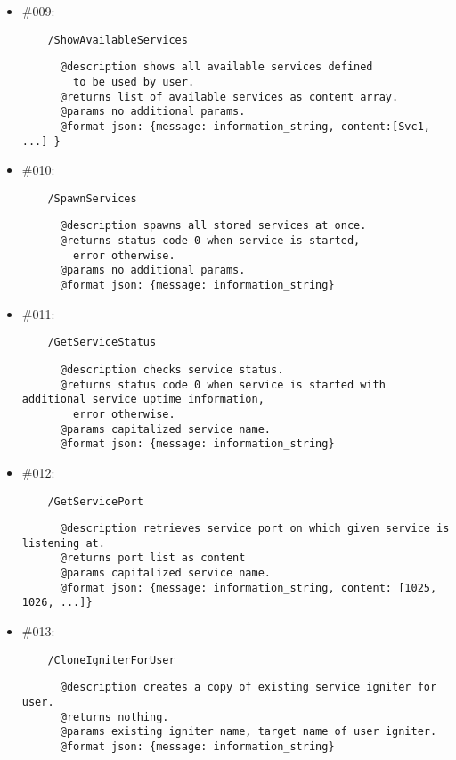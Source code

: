 \documentclass[11pt,a4paper]{scrartcl}
\begin{document}
\begin{itemize}
    \item \#009:
      \begin{verbatim}
    /ShowAvailableServices
      \end{verbatim}
      \begin{verbatim}
      @description shows all available services defined
        to be used by user.
      @returns list of available services as content array.
      @params no additional params.
      @format json: {message: information_string, content:[Svc1, ...] }
      \end{verbatim}

    \item \#010:
      \begin{verbatim}
    /SpawnServices
      \end{verbatim}
      \begin{verbatim}
      @description spawns all stored services at once.
      @returns status code 0 when service is started,
        error otherwise.
      @params no additional params.
      @format json: {message: information_string}
      \end{verbatim}

    \item \#011:
      \begin{verbatim}
    /GetServiceStatus
      \end{verbatim}
      \begin{verbatim}
      @description checks service status.
      @returns status code 0 when service is started with additional service uptime information,
        error otherwise.
      @params capitalized service name.
      @format json: {message: information_string}
      \end{verbatim}

    \item \#012:
      \begin{verbatim}
    /GetServicePort
      \end{verbatim}
      \begin{verbatim}
      @description retrieves service port on which given service is listening at.
      @returns port list as content
      @params capitalized service name.
      @format json: {message: information_string, content: [1025, 1026, ...]}
      \end{verbatim}

    \item \#013:
      \begin{verbatim}
    /CloneIgniterForUser
      \end{verbatim}
      \begin{verbatim}
      @description creates a copy of existing service igniter for user.
      @returns nothing.
      @params existing igniter name, target name of user igniter.
      @format json: {message: information_string}
      \end{verbatim}



  \end{itemize}
\end{document}

